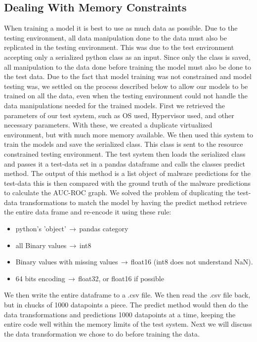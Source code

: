 \documentclass[sigconf]{acmart}
\begin{document}
\subsection{Dealing With Memory Constraints}
When training a model it is best to use as much data as possible. Due to the testing environment, all data manipulation done to the data must also be replicated in the testing environment. This was due to the test environment accepting only a serialized python class as an input. Since only the class is saved, all manipulation to the data done before training the model must also be done to the test data. Due to the fact that model training was not constrained and model testing was, we settled on the process described below to allow our models to be trained on all the data, even when the testing environment could not handle the data manipulations needed for the trained models. First we retrieved the parameters of our test system, such as OS used, Hypervisor used, and other necessary parameters. With these, we created a duplicate virtualized environment, but with much more memory available. We then used this system to train the models and save the serialized class. This class is sent to the resource constrained testing environment. The test system then loads the serialized class and passes it a test-data set in a pandas dataframe and calls the classes predict method. The output of this method is a list object of malware predictions for the test-data this is then compared with the ground truth of the malware predictions to calculate the AUC-ROC graph. We solved the problem of duplicating the test-data transformations to match the model by having the predict method retrieve the entire data frame and re-encode it using these rule:
\begin{itemize}
\item python's 'object'$\,\to\,$pandas category
\item all Binary values$\,\to\,$int8
\item Binary values with missing values$\,\to\,$float16 (int8 does not understand NaN).
\item 64 bits encoding$\,\to\,$float32, or float16 if possible
\end{itemize}
We then write the entire dataframe to a .csv file. We then read the .csv file back, but in chucks of 1000 datapoints a piece. The predict method would then do the data transformations and predictions 1000 datapoints at a time, keeping the entire code well within the memory limits of the test system. Next we will discuss the data transformation we chose to do before training the data.
\end{document}
